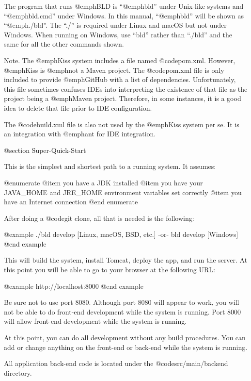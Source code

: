 The program that runs @emph{BLD} is ``@emph{bld}'' under Unix-like
systems and ``@emph{bld.cmd}'' under Windows.  In this manual,
``@emph{bld}'' will be shown as ``@emph{./bld}''.  The ``./'' is
required under Linux and macOS but not under Windows.  When running on
Windows, use ``bld'' rather than ``./bld'' and the same for all the
other commands shown.

Note.  The @emph{Kiss} system includes a file named @code{pom.xml}.
However, @emph{Kiss} is @emph{not} a Maven project.  The
@code{pom.xml} file is only included to provide @emph{GitHub} with a
list of dependencies.  Unfortunately, this file sometimes confuses IDEs
into interpreting the existence of that file as the project being a
@emph{Maven} project.  Therefore, in some instances, it is a good idea
to delete that file prior to IDE configuration.

The @code{build.xml} file is also not used by the @emph{Kiss} system per se.
It is an integration with @emph{ant} for IDE integration.


@section Super-Quick-Start

This is the simplest and shortest path to a running system.  It assumes:

@enumerate
@item
you have a JDK installed
@item
you have your JAVA_HOME and JRE_HOME environment variables set correctly
@item
you have an Internet connection
@end enumerate

After doing a @code{git clone}, all that is needed is the following:

@example
    ./bld  develop                      [Linux, macOS, BSD, etc.]
         -or-
    bld  develop                        [Windows]
@end example

This will build the system, install Tomcat, deploy the app, and run
the server.  At this point you will be able to go to your browser at the
following URL:

@example
    http://localhost:8000
@end example

Be sure not to use port 8080.  Although port 8080 will appear to work,
you will not be able to do front-end development while the system is
running.  Port 8000 will allow front-end development while the system
is running.

At this point, you can do all development without any build
procedures.  You can add or change anything on the front-end or
back-end while the system is running.

All application back-end code is located under the @code{src/main/backend}
directory.

